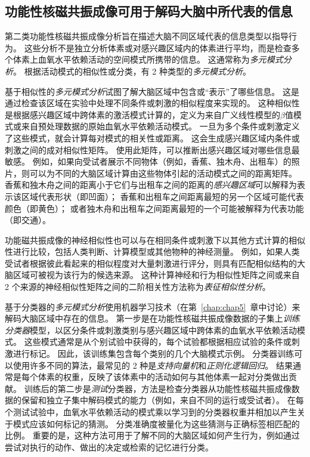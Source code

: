 \subsection{功能性核磁共振成像可用于解码大脑中所代表的信息}

第二类功能性核磁共振成像分析旨在描述大脑不同区域代表的信息类型以指导行为。
这些分析不是独立分析体素或对感兴趣区域内的体素进行平均，而是检查多个体素上血氧水平依赖活动的空间模式所携带的信息。 
这通常称为\textit{多元模式分析}。
根据活动模式的相似性或分类，有 2 种类型的\textit{多元模式分析}。


基于相似性的\textit{多元模式分析}试图了解大脑区域中包含或“表示”了哪些信息。 
这是通过检查该区域在实验中处理不同条件或刺激的相似程度来实现的。 
这种相似性是根据感兴趣区域中跨体素的激活模式计算的，定义为来自广义线性模型的$\beta$值模式或来自预处理数据的原始血氧水平依赖活动模式。
一旦为多个条件或刺激定义了这些模式，就会计算每对模式的相关性或距离。 
这会生成感兴趣区域内条件或刺激之间的成对相似性矩阵。 
使用此矩阵，可以推断出感兴趣区域对哪些信息最敏感。 
例如，如果向受试者展示不同物体（例如，香蕉、独木舟、出租车）的照片，则可以为不同的大脑区域计算由这些物体引起的活动模式之间的距离矩阵。
香蕉和独木舟之间的距离小于它们与出租车之间的距离的\textit{感兴趣区域}可以解释为表示该区域代表形状（即凹面）；
香蕉和出租车之间距离最短的另一个区域可能代表颜色（即黄色）；
或者独木舟和出租车之间距离最短的一个可能被解释为代表功能（即交通）。


功能磁共振成像的神经相似性也可以与在相同条件或刺激下以其他方式计算的相似性进行比较，包括人类判断、计算模型或其他物种的神经测量。
例如，如果人类受试者根据彼此看起来的相似程度对大量刺激进行评分，则具有匹配相似结构的大脑区域可被视为该行为的候选来源。
这种计算神经和行为相似性矩阵之间或来自 2 个来源的神经相似性矩阵之间的二阶相关性方法称为\textit{表征相似性分析}。


基于分类器的\textit{多元模式分析}使用机器学习技术（在第~\ref{chap:chap5}~章中讨论）来解码大脑区域中存在的信息。 
第一步是在功能性核磁共振成像数据的子集上\textit{训练分类器}模型，以区分条件或刺激类别与感兴趣区域中跨体素的血氧水平依赖活动模式。
这些模式通常是从个别试验中获得的，每个试验都根据相应试验的条件或刺激进行标记。
因此，该训练集包含每个类别的几个大脑模式示例。
分类器训练可以使用许多不同的算法，最常见的 2 种是\textit{支持向量机}和\textit{正则化逻辑回归}。
结果通常是每个体素的权重，反映了该体素中的活动如何与其他体素一起对分类做出贡献。
训练后的第二步是\textit{测试}分类器，方法是检查分类器从功能性核磁共振成像数据的保留和独立子集中解码模式的能力（例如，来自不同的运行或受试者）。
在每个测试试验中，血氧水平依赖活动的模式乘以学习到的分类器权重并相加以产生关于模式应该如何标记的猜测。
分类准确度被量化为这些猜测与正确标签相匹配的比例。
重要的是，这种方法可用于了解不同的大脑区域如何产生行为，例如通过尝试对执行的动作、做出的决定或检索的记忆进行分类。



